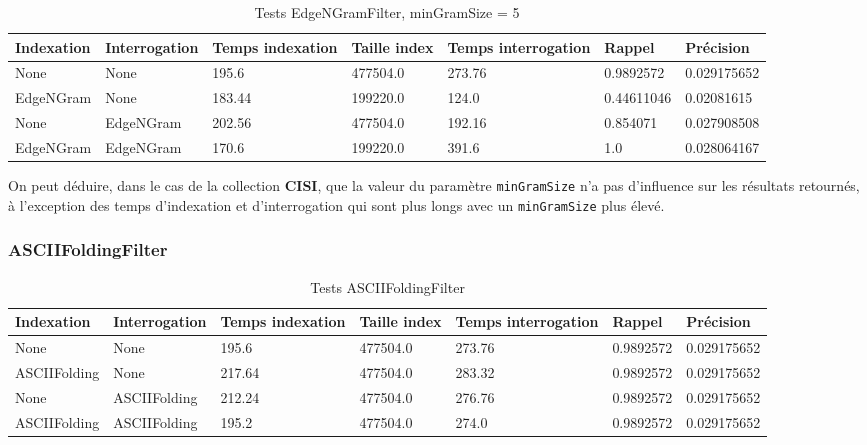 \begin{table}[!htbp]
    \hspace{-2cm}
                \begin{tabular}{|p{2.5cm}|p{2.5cm}|p{2cm}|p{2cm}|p{2.5cm}|p{2cm}|p{2cm}|}
                    \hline
                    \textbf{Indexation} & \textbf{Interrogation} & \textbf{Temps \mbox{indexation}} & \textbf{Taille \mbox{index}} & \textbf{Temps \mbox{interrogation}} & \textbf{Rappel} & \textbf{Précision}\\
                    \hline
                    None & None & 195.6 & 477504.0 & 273.76 & 0.9892572 & 0.029175652\\
                    \hline
EdgeNGram & None & 183.44 & 199220.0 & 124.0 & 0.44611046 & 0.02081615\\
		\hline
None & EdgeNGram & 202.56 & 477504.0 & 192.16 & 0.854071 & 0.027908508\\
		\hline
EdgeNGram & EdgeNGram & 170.6 & 199220.0 & 391.6 & 1.0 & 0.028064167\\
                    \hline
                \end{tabular}
                \caption{Tests EdgeNGramFilter, minGramSize = 5}
                \label{tab:tests_EdgeNGramFilter5}
            \end{table}

On peut déduire, dans le cas de la collection \textbf{CISI}, que la valeur du paramètre \texttt{minGramSize} n’a pas d'influence sur les résultats retournés, à l’exception des temps d’indexation et d’interrogation qui sont plus longs avec un \texttt{minGramSize} plus élevé.

\subsubsection{ASCIIFoldingFilter}

\begin{table}[!htbp]
    \hspace{-2cm}
                \begin{tabular}{|p{2.5cm}|p{2.5cm}|p{2cm}|p{2cm}|p{2.5cm}|p{2cm}|p{2cm}|}
                    \hline
                    \textbf{Indexation} & \textbf{Interrogation} & \textbf{Temps \mbox{indexation}} & \textbf{Taille \mbox{index}} & \textbf{Temps \mbox{interrogation}} & \textbf{Rappel} & \textbf{Précision}\\
                    \hline
                    None & None & 195.6 & 477504.0 & 273.76 & 0.9892572 & 0.029175652\\
                    \hline
ASCIIFolding & None & 217.64 & 477504.0 & 283.32 & 0.9892572 & 0.029175652\\
		\hline
None & ASCIIFolding & 212.24 & 477504.0 & 276.76 & 0.9892572 & 0.029175652\\
		\hline
ASCIIFolding & ASCIIFolding & 195.2 & 477504.0 & 274.0 & 0.9892572 & 0.029175652\\
                    \hline
                \end{tabular}
                \caption{Tests ASCIIFoldingFilter}
                \label{tab:tests_ASCIIFoldingFilter}
            \end{table}

